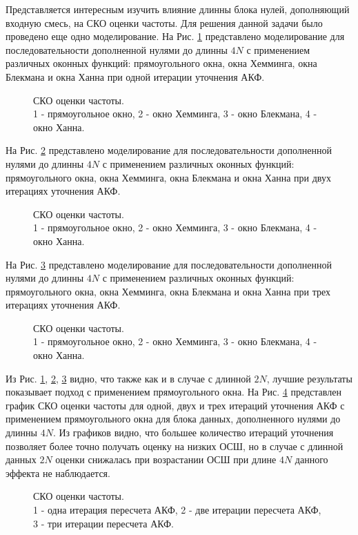Представляется интересным изучить влияние длинны блока нулей, дополняющий входную смесь, на СКО оценки частоты. Для решения данной задачи было проведено еще одно моделирование.
На Рис. \ref{pic:fft4_1} представлено моделирование для последовательности дополненной нулями до длинны ${4N}$ с применением различных оконных функций:
прямоугольного окна, окна Хемминга, окна Блекмана и окна Ханна при одной итерации уточнения АКФ.
\begin{figure}[h]
	\center{}
	\caption{СКО оценки частоты.\\1 - прямоугольное окно, 2 - окно Хемминга, 3 - окно Блекмана, 4 - окно Ханна.}
	\label{pic:fft4_1}
\end{figure}

На Рис. \ref{pic:fft4_2} представлено моделирование для последовательности дополненной нулями до длинны ${4N}$ с применением различных оконных функций:
прямоугольного окна, окна Хемминга, окна Блекмана и окна Ханна при двух итерациях уточнения АКФ.
\begin{figure}[h]
	\center{}
	\caption{СКО оценки частоты.\\1 - прямоугольное окно, 2 - окно Хемминга, 3 - окно Блекмана, 4 - окно Ханна.}
	\label{pic:fft4_2}
\end{figure}

На Рис. \ref{pic:fft4_3} представлено моделирование для последовательности дополненной нулями до длинны ${4N}$ с применением различных оконных функций:
прямоугольного окна, окна Хемминга, окна Блекмана и окна Ханна при трех итерациях уточнения АКФ.
\begin{figure}[h]
	\center{}
	\caption{СКО оценки частоты.\\1 - прямоугольное окно, 2 - окно Хемминга, 3 - окно Блекмана, 4 - окно Ханна.}
	\label{pic:fft4_3}
\end{figure}

Из Рис. \ref{pic:fft4_1}, \ref{pic:fft4_2}, \ref{pic:fft4_3} видно, что также как и в случае с длинной ${2N}$, лучшие результаты показывает подход с применением прямоугольного окна.
На Рис. \ref{pic:fft4_rect_1_2_3}
представлен график СКО оценки частоты для одной, двух и трех итераций уточнения АКФ с применением прямоугольного окна для блока данных, дополненного нулями до длинны ${4N}$.
Из графиков видно, что большее количество итераций уточнения позволяет более точно получать оценку на низких ОСШ, но в случае с длинной данных ${2N}$ оценки снижалась при
возрастании ОСШ при длине ${4N}$ данного эффекта не наблюдается.
\begin{figure}[h]
	\center{}
	\caption{СКО оценки частоты.\\1 - одна итерация пересчета АКФ, 2 - две итерации пересчета АКФ, 3 - три итерации пересчета АКФ.}
	\label{pic:fft4_rect_1_2_3}
\end{figure}

